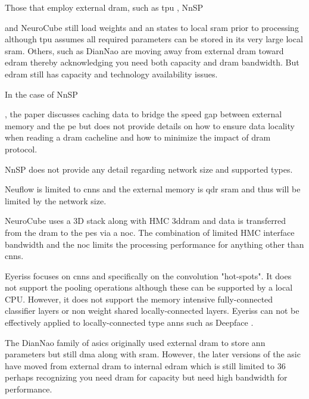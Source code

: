 Those that employ external \ac{dram}, such as \ac{tpu} \cite{tensorflow2015-whitepaper}, NnSP{\cite{esmaeilzadeh2005nnsp} and NeuroCube\cite{kim2016neurocube} still 
load weights and \ac{an} states to local \ac{sram} prior to processing although \ac{tpu} assumes all required parameters can be stored in its very large local \ac{sram}.
Others, such as DianNao \cite{chen2016diannao} are moving away from external \ac{dram} toward \ac{edram} thereby acknowledging you need both capacity and \ac{dram} bandwidth. 
But \ac{edram} still has capacity and technology availability issues.

In the case of NnSP{\cite{esmaeilzadeh2005nnsp}, the paper discusses caching data to bridge the speed gap between external memory and the \ac{pe} 
but does not provide details on how to ensure data locality when reading a \ac{dram} cacheline and how to minimize the impact of \ac{dram} protocol.

NnSP does not provide any detail regarding network size and supported types.

Neuflow\cite{farabet2011neuflow} is limited to \acp{cnn} and the external memory is \ac{qdr} \ac{sram} 
and thus will be limited by the network size.

NeuroCube uses a 3D stack along with HMC \ac{3ddram} and data is transferred from the \ac{dram} to the \acp{pe} via a \ac{noc}.
The combination of limited HMC interface bandwidth and the \ac{noc} limits the processing performance for anything other than \acp{cnn}.

Eyeriss\cite{chen201614} focuses on \acp{cnn} and specifically on the convolution "hot-spots". It does not support the pooling operations although these can
be supported by a local CPU.  However, it does not support the memory intensive fully-connected classifier layers or non weight shared locally-connected layers.
Eyeriss can not be effectively applied to locally-connected type \acp{ann} such as Deepface \cite{Taigman_2014_CVPR}.

The DianNao family of \acp{asic} \cite{chen2014diannao} \cite{chen2016diannao} originally used external \ac{dram} to store \ac{ann} parameters but still \ac{dma} along with \ac{sram}.
However, the later versions of the \ac{asic} have moved from external \ac{dram} to internal \ac{edram} \cite{chen2016diannao} which is still limited to \SI[per-mode=symbol]{36}{\mega \byte} perhaps recognizing you need \ac{dram} for capacity but need high bandwidth for performance.


}}
